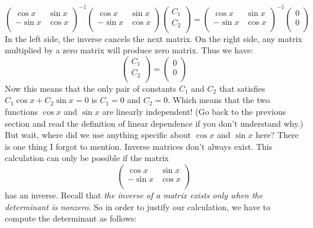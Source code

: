 \documentclass[12pt]{report}
\begin{document}
$$\left( {\begin{array}{cc} \cos x & \sin x \\ -\sin x & \cos x \\ \end{array} } \right)^{-1}\left( {\begin{array}{cc} \cos x & \sin x \\ -\sin x & \cos x \\ \end{array} } \right) \left( {\begin{array}{c} C_1 \\  C_2 \\ \end{array} } \right) = \left( {\begin{array}{cc} \cos x & \sin x \\ -\sin x & \cos x \\ \end{array} } \right)^{-1} \left( {\begin{array}{c} 0 \\  0 \\ \end{array} } \right) $$
In the left side, the inverse cancels the next matrix. On the right side, any matrix multiplied by a zero matrix will produce zero matrix. Thus we have:
$$\left( {\begin{array}{c} C_1 \\  C_2 \\ \end{array} } \right) =\left( {\begin{array}{c} 0 \\  0 \\ \end{array} } \right) $$
Now this means that the only pair of constants $C_1$ and $C_2$ that satisfies $C_1 \cos x + C_2 \sin x = 0$ is $C_1=0$ and $C_2=0$. Which means that the two functions $\cos x$ and $\sin x $ are linearly independent! (Go back to the previous section and read the definition of linear dependence if you don't understand why.)
But wait, where did we use anything specific about $\cos x$ and $\sin x $ here? There is one thing I forgot to mention. Inverse matrices don't always exist. This calculation can only be possible if the matrix
$$\left( {\begin{array}{cc} \cos x & \sin x \\ -\sin x & \cos x \\ \end{array} } \right) $$
has an inverse. Recall that \textit{the inverse of a matrix exists only when the determinant is nonzero.} So in order to justify our calculation, we have to compute the determinant as follows:
\end{document}
